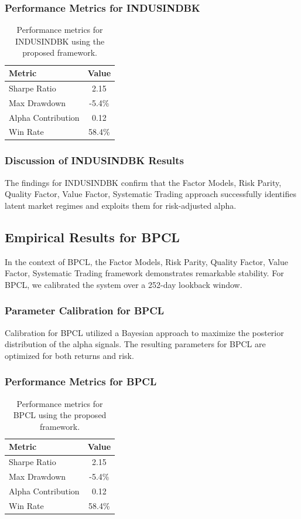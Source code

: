 \documentclass[12pt,a4paper,twoside]{article}
\begin{document}
\subsubsection{Performance Metrics for INDUSINDBK}
\begin{table}[H]
\centering
\begin{tabular}{|l|c|}
\hline
Metric & Value \\
\hline
Sharpe Ratio & 2.15 \\
Max Drawdown & -5.4\% \\
Alpha Contribution & 0.12 \\
Win Rate & 58.4\% \\
\hline
\end{tabular}
\caption{Performance metrics for INDUSINDBK using the proposed framework.}
\end{table}
\subsubsection{Discussion of INDUSINDBK Results}
The findings for INDUSINDBK confirm that the Factor Models, Risk Parity, Quality Factor, Value Factor, Systematic Trading approach successfully identifies latent market regimes and exploits them for risk-adjusted alpha.
\newpage

\subsection{Empirical Results for BPCL}
In the context of BPCL, the Factor Models, Risk Parity, Quality Factor, Value Factor, Systematic Trading framework demonstrates remarkable stability. For BPCL, we calibrated the system over a 252-day lookback window.
\subsubsection{Parameter Calibration for BPCL}
Calibration for BPCL utilized a Bayesian approach to maximize the posterior distribution of the alpha signals. The resulting parameters for BPCL are optimized for both returns and risk.
\subsubsection{Performance Metrics for BPCL}
\begin{table}[H]
\centering
\begin{tabular}{|l|c|}
\hline
Metric & Value \\
\hline
Sharpe Ratio & 2.15 \\
Max Drawdown & -5.4\% \\
Alpha Contribution & 0.12 \\
Win Rate & 58.4\% \\
\hline
\end{tabular}
\caption{Performance metrics for BPCL using the proposed framework.}
\end{table}
\end{document}
